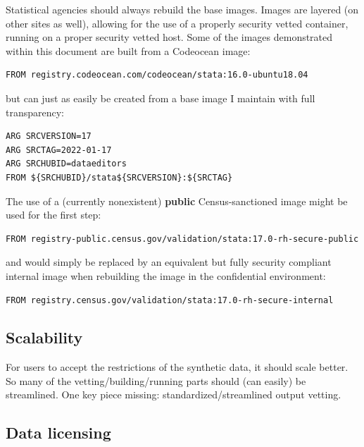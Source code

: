 \documentclass[inline]{hdsr}
\begin{document}
Statistical agencies should always rebuild the base images. Images are layered (on other sites as well), allowing for the use of a properly security vetted container, running on a proper security vetted host. Some of the images demonstrated within this document are built from a Codeocean image:

\begin{lstlisting}[language=docker]
FROM registry.codeocean.com/codeocean/stata:16.0-ubuntu18.04
\end{lstlisting}

\noindent but can just as easily be created from a base image I maintain with full transparency:

\begin{lstlisting}[language=docker]
ARG SRCVERSION=17
ARG SRCTAG=2022-01-17
ARG SRCHUBID=dataeditors
FROM ${SRCHUBID}/stata${SRCVERSION}:${SRCTAG}
\end{lstlisting}

\noindent The use of a  (currently nonexistent) \textbf{public}  Census-sanctioned image might be used for the first step:

\begin{lstlisting}[language=docker]
FROM registry-public.census.gov/validation/stata:17.0-rh-secure-public
\end{lstlisting}

\noindent and would simply be replaced by an equivalent but fully security compliant internal image when rebuilding the image in the confidential environment:

\begin{lstlisting}[language=docker]
FROM registry.census.gov/validation/stata:17.0-rh-secure-internal
\end{lstlisting}



\subsection{Scalability}

For users to accept the restrictions of the synthetic data, it should scale better. So many of the vetting/building/running parts should (can easily) be streamlined. One key piece missing: standardized/streamlined output vetting.

\subsection{Data licensing}
\end{document}
